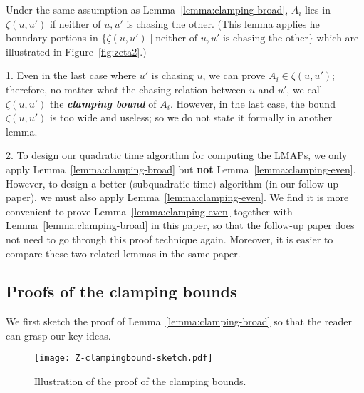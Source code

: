 \documentclass{ws-ijcga}
\begin{document}
\begin{lemma}\label{lemma:clamping-even}
Under the same assumption as Lemma~\ref{lemma:clamping-broad},
$A_i$ lies in $\zeta(u,u')$ if neither of $u,u'$ is chasing the other.
(This lemma applies he boundary-portions in $\{\zeta(u,u')\mid \text{neither of }u,u' \text{ is chasing the other}\}$ which are illustrated in Figure~\ref{fig:zeta2}.)
\end{lemma}

\begin{remark}
1. Even in the last case where $u'$ is chasing $u$, we can prove $A_i\in \zeta(u,u')$;
therefore, no matter what the chasing relation between $u$ and $u'$, we call $\zeta(u,u')$ the \textbf{\emph{clamping bound}} of $A_i$.
However, in the last case, the bound $\zeta(u,u')$ is too wide and useless; so we do not state it formally in another lemma.

2. To design our quadratic time algorithm for computing the LMAPs, we only apply Lemma~\ref{lemma:clamping-broad} but \textbf{not} Lemma~\ref{lemma:clamping-even}.
However, to design a better (subquadratic time) algorithm (in our follow-up paper), we must also apply Lemma~\ref{lemma:clamping-even}.
We find it is more convenient to prove Lemma~\ref{lemma:clamping-even} together with Lemma~\ref{lemma:clamping-broad} in this paper,
so that the follow-up paper does not need to go through this proof technique again.
Moreover, it is easier to compare these two related lemmas in the same paper.
\end{remark}

\subsection{Proofs of the clamping bounds}

We first sketch the proof of Lemma~\ref{lemma:clamping-broad} so that the reader can grasp our key ideas.
\begin{figure}[h]
  \centering \texttt{[image: Z-clampingbound-sketch.pdf]}
  \caption{Illustration of the proof of the clamping bounds.}\label{fig:PC_sketch}
\end{figure}
\end{document}
